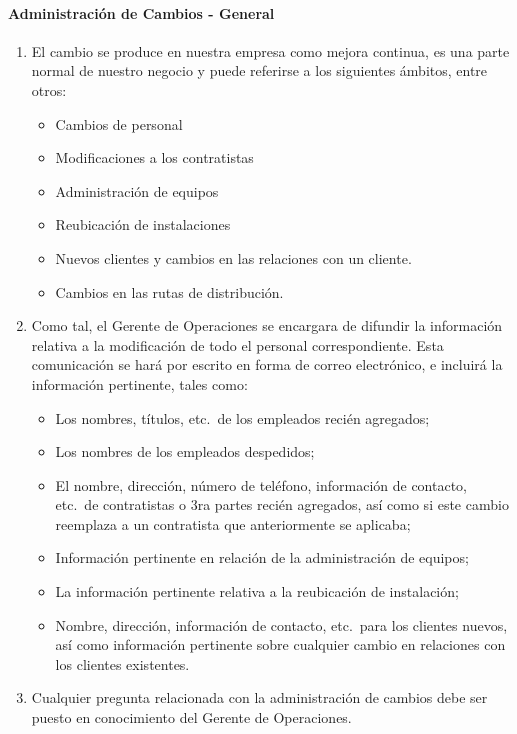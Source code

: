 \paragraph{Administración de Cambios - General}

\begin{enumerate}
	\item El cambio se produce en nuestra empresa como mejora continua, es una parte normal de nuestro negocio y puede referirse a los siguientes ámbitos, entre otros:
	\begin{itemize}
		\item Cambios de personal
		\item Modificaciones a los contratistas
		\item Administración de equipos
		\item Reubicación de instalaciones
		\item Nuevos clientes y cambios en las relaciones con un cliente.
		\item Cambios en las rutas de distribución.
	\end{itemize}
	\item Como tal, el Gerente de Operaciones se encargara de difundir la información relativa a la modificación de todo el personal correspondiente. Esta comunicación se hará por escrito en forma de correo electrónico, e incluirá la información pertinente, tales como:
	\begin{itemize}
		\item Los nombres, títulos, etc.\ de los empleados recién agregados;
		\item Los nombres de los empleados despedidos;
		\item El nombre, dirección, número de teléfono, información de contacto, etc.\ de contratistas o 3ra partes recién agregados, así como si este cambio reemplaza a un contratista que anteriormente se aplicaba;
		\item Información pertinente en relación de la administración de equipos;
		\item La información pertinente relativa a la reubicación de instalación;
		\item Nombre, dirección, información de contacto, etc.\ para los clientes nuevos, así como información pertinente sobre cualquier cambio en relaciones con los clientes existentes.
	\end{itemize}
	\item Cualquier pregunta  relacionada con la administración de cambios debe ser puesto en conocimiento del Gerente de Operaciones.
\end{enumerate}


